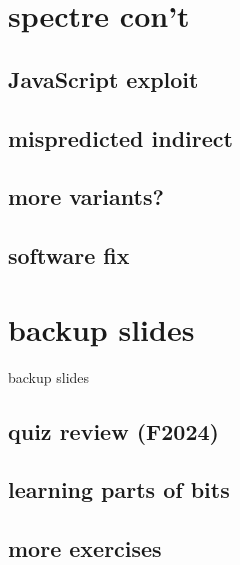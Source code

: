 \section{spectre con't}

\subsection{JavaScript exploit}


\subsection{mispredicted indirect}


\subsection{more variants?}


\subsection{software fix}


\section{backup slides}
\begin{frame}{backup slides}
\end{frame}

\subsection{quiz review (F2024)}


\subsection{learning parts of bits}


\subsection{more exercises}


